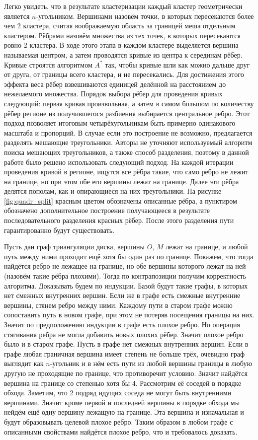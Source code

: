 \documentclass[12pt]{extarticle}
\begin{document}
Легко увидеть, что в результате кластеризации каждый кластер геометрически является $n$-угольником. Вершинами назовём точки, в которых пересекаются более чем $2$ кластера, считая воображаемую область за границей меша отдельным кластером. Рёбрами назовём множества из тех точек, в которых пересекаются ровно 2 кластера. В ходе этого этапа в каждом кластере выделяется вершина называемая центром, а затем проводятся кривые из центра к серединам рёбер. Кривые строятся алгоритмом $A^*$ \cite{astar} так, чтобы кривые шли как можно дальше друг от друга, от границы всего кластера, и не пересекались. Для достижения этого эффекта веса рёбер взвешиваются единицей делённой на расстоянием до нежелаемого множества. Порядок выбора рёбер для проведения кривых следующий: первая кривая произвольная, а затем в самом большом по количеству рёбер регионе из получившегося разбиения выбирается центральное ребро. Этот подход позволяет итоговым четырёхугольникам быть примерно одинакового масштаба и пропорций. В случае если это построение не возможно, предлагается разделять мешающие треугольники. Авторы не уточняют используемый алгоритм поиска мешающих треугольников, а также способ разделения, поэтому в данной работе было решено использовать следующий подход. На каждой итерации проведения кривой в регионе, ищутся все рёбра такие, что само ребро не лежит на границе, но при этом обе его вершины лежат на границе. Далее эти рёбра делятся пополам, как и опирающиеся на них треугольники. На рисунке \ref{fig:quadr_split} красным цветом обозначены описанные рёбра, а пунктиром обозначено дополнительное построение получающееся в результате последовательного разделения красных рёбер. После этого разделения пути гарантированно будут существовать.

Пусть дан граф триангуляции диска, вершины $O$, $M$ лежат на границе, и любой путь между ними проходит ещё хотя бы один раз по границе. Покажем, что тогда найдётся ребро не лежащее на границе, но обе вершины которого лежат на ней (назовём такие рёбра плохими). Тогда по контрапозиции получим корректность алгоритма.
%
Доказывать будем по индукции. Базой будут такие графы, в которых нет смежных внутренних вершин. Если же в графе есть смежные внутренние вершины, стянем ребро между ними. Каждому пути в старом графе можно сопоставить путь в новом графе, при этом не потеряв посещения границы на них. Значит по предположению индукции в графе есть плохое ребро. Но операция стягивания ребра не могла добавить новых плохих рёбер. Значит плохое ребро было и в старом графе.
%
Пусть в графе нет смежных внутренних вершин. Если в графе любая граничная вершина имеет степень не больше трёх, очевидно граф выглядит как $n$-угольник и в нём есть пути из любой вершины границы в любую другую не проходящие по границе, что противоречит условию. Значит найдётся вершина на границе со степенью хотя бы 4. Рассмотрим её соседей в порядке обхода. Заметим, что 2 подряд идущих соседа не могут быть внутренними вершинами. Значит кроме первой и последней вершины в порядке обхода мы нейдём ещё одну вершину лежащую на границе. Эта вершина и изначальная и будут образовывать целевой плохое ребро.
%
Таким образом в любом графе с описанными свойствами найдётся плохое ребро, что и требовалось доказать.
\end{document}
